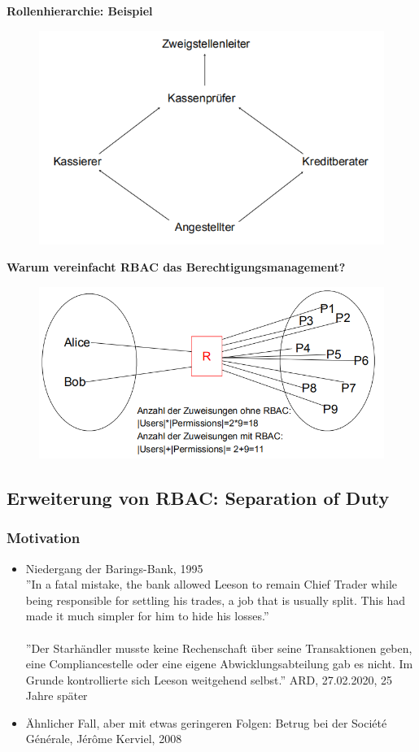 \documentclass[openany]{book}
\begin{document}
\textbf{Rollenhierarchie: Beispiel}

\begin{figure}[h!]
    \centering
    \includegraphics[width=0.55\linewidth]{Pics/RBAC_EXAMPLE.PNG}
\end{figure}

\textbf{Warum vereinfacht RBAC das Berechtigungsmanagement?}

\begin{figure}[h!]
    \centering
    \includegraphics[width=0.85\linewidth]{Pics/RBAC2.PNG}
\end{figure}

\subsection{Erweiterung von RBAC: Separation of Duty}

\subsubsection{Motivation}

\begin{itemize}
    \item Niedergang der Barings-Bank, 1995 \\ ''In a fatal mistake, the bank allowed Leeson to remain Chief Trader while being responsible for settling his trades, a job that is usually split. This had made it much simpler for him to hide his losses.'' \\ \\ ''Der Starhändler musste keine Rechenschaft über seine Transaktionen geben, eine Compliancestelle oder eine eigene Abwicklungsabteilung gab es nicht. Im Grunde kontrollierte sich Leeson weitgehend selbst.'' ARD, 27.02.2020, 25 Jahre später
    \item Ähnlicher Fall, aber mit etwas geringeren Folgen: Betrug bei der Société Générale, Jérôme Kerviel, 2008
\end{itemize}
\end{document}
